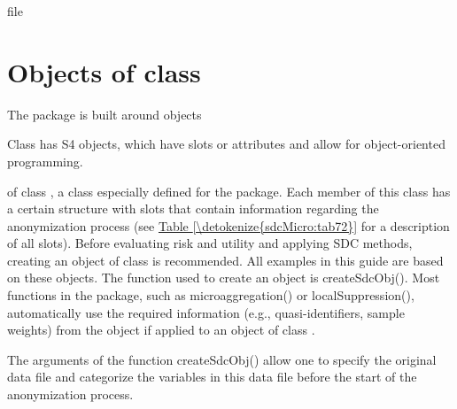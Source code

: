\documentclass[letterpaper,10pt,english]{sphinxmanual}
\begin{document}
\def\sphinxLiteralBlockLabel{\label{\detokenize{sdcMicro:code77}}}
%
\begin{sphinxVerbatim}[commandchars=\\\{\},numbers=left,firstnumber=1,stepnumber=1]

file  

\end{sphinxVerbatim}


\section{Objects of class }
\label{\detokenize{sdcMicro:objects-of-class-sdcmicroobj}}
The  package is built around objects %
\begin{footnote}[5]\sphinxAtStartFootnote
Class  has S4 objects, which have slots or attributes
and allow for object-oriented programming.
%
\end{footnote} of
class , a class especially defined for the 
package. Each member of this class has a certain structure with slots
that contain information regarding the anonymization process (see \hyperref[\detokenize{sdcMicro:tab72}]{Table \ref{\detokenize{sdcMicro:tab72}}}
for a description of all slots). Before evaluating risk
and utility and applying SDC methods, creating an object of class
 is recommended. All examples in this guide are based on these
objects. The function used to create an  object is
createSdcObj(). Most functions in the  package, such as
microaggregation() or localSuppression(), automatically use the required
information (e.g., quasi-identifiers, sample weights) from the
 object if applied to an object of class .

The arguments of the function createSdcObj() allow one to specify the
original data file and categorize the variables in this data file before
the start of the anonymization process.
\end{document}

